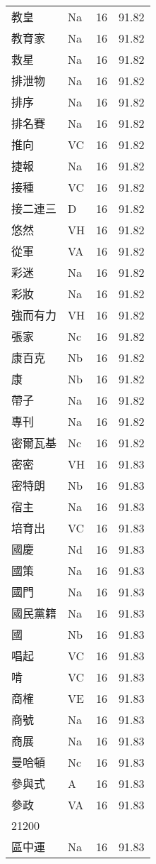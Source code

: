 \documentclass[twocolumn]{book}
\begin{document}
\begin{supertabular}{llrr}
教皇 & Na & 16 &  91.82\\
教育家 & Na & 16 &  91.82\\
救星 & Na & 16 &  91.82\\
排泄物 & Na & 16 &  91.82\\
排序 & Na & 16 &  91.82\\
排名賽 & Na & 16 &  91.82\\
推向 & VC & 16 &  91.82\\
捷報 & Na & 16 &  91.82\\
接種 & VC & 16 &  91.82\\
接二連三 & D & 16 &  91.82\\
悠然 & VH & 16 &  91.82\\
從軍 & VA & 16 &  91.82\\
彩迷 & Na & 16 &  91.82\\
彩妝 & Na & 16 &  91.82\\
強而有力 & VH & 16 &  91.82\\
張家 & Nc & 16 &  91.82\\
康百克 & Nb & 16 &  91.82\\
康 & Nb & 16 &  91.82\\
帶子 & Na & 16 &  91.82\\
專刊 & Na & 16 &  91.82\\
密爾瓦基 & Nc & 16 &  91.82\\
密密 & VH & 16 &  91.83\\
密特朗 & Nb & 16 &  91.83\\
宿主 & Na & 16 &  91.83\\
培育出 & VC & 16 &  91.83\\
國慶 & Nd & 16 &  91.83\\
國策 & Na & 16 &  91.83\\
國門 & Na & 16 &  91.83\\
國民黨籍 & Na & 16 &  91.83\\
國 & Nb & 16 &  91.83\\
唱起 & VC & 16 &  91.83\\
啃 & VC & 16 &  91.83\\
商榷 & VE & 16 &  91.83\\
商號 & Na & 16 &  91.83\\
商展 & Na & 16 &  91.83\\
曼哈頓 & Nc & 16 &  91.83\\
參與式 & A & 16 &  91.83\\
參政 & VA & 16 &  91.83\\
21200\\
區中運 & Na & 16 &  91.83\\

\end{supertabular}
\end{document}
